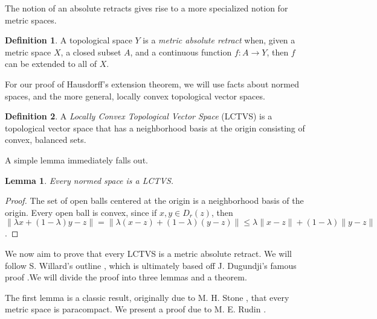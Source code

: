 \documentclass[openany, amssymb, psamsfonts]{amsart}
\newtheorem{lem}{Lemma}[section]
\theoremstyle{definition}
\newtheorem{defn}{Definition}[section]
\numberwithin{equation}{section}
\begin{document}
The notion of an absolute retracts gives rise to a more specialized notion for metric spaces. 
\begin{defn}
  A topological space $Y$ is a \emph{metric absolute retract} when, given a metric space $X$, a closed subset $A$, and a continuous function $f:A\to Y$, then $f$ can be extended to all of $X$. 
\end{defn}

For our proof of Hausdorff's extension theorem, we will use facts about normed spaces, and the more general, locally convex topological vector spaces. 

\begin{defn}
  A \emph{Locally Convex Topological Vector Space} (LCTVS) is a topological vector space that has a neighborhood basis at the origin consisting of convex, balanced sets.
\end{defn}

A simple lemma immediately falls out. 

\begin{lem} \label{lem:3.11}
  Every normed space is a LCTVS.
\end{lem}
\begin{proof}
  The set of open balls centered at the origin is a neighborhood basis of the origin. Every open ball is convex, since if $x,y \in D_r(z)$, then $\|\lambda x + (1-\lambda)y - z\| = \|\lambda(x-z) + (1-\lambda)(y-z)\| \le \lambda \|x-z\| + (1-\lambda)\|y - z\|$. 
\end{proof}

We now aim to prove that every LCTVS is a metric absolute retract. We will follow S. Willard's outline \cite{willard}, which is ultimately based off J. Dugundji's famous proof \cite{dugundji}.We will divide the proof into three lemmas and a theorem. 

The first lemma is a classic result, originally due to M. H. Stone \cite{stone}, that every metric space is paracompact. We present a proof due to M. E. Rudin \cite{rudin}.
\end{document}

